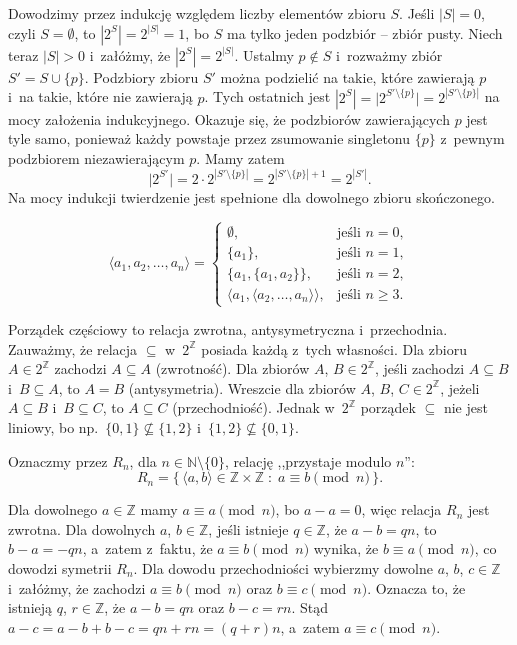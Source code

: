 \exercise %
Dowodzimy przez indukcję względem liczby elementów zbioru $S$. Jeśli $|S|=0$, czyli $S=\emptyset$, to $|2^S|=2^{|S|}=1$, bo $S$ ma tylko jeden podzbiór -- zbiór pusty. Niech teraz $|S|>0$ i~załóżmy, że $|2^S|=2^{|S|}$. Ustalmy $p\notin S$ i~rozważmy zbiór $S'=S\cup\{p\}$. Podzbiory zbioru $S'$ można podzielić na takie, które zawierają $p$ i~na takie, które nie zawierają $p$. Tych ostatnich jest $|2^S|=\bigl|2^{S'\setminus\{p\}}\bigr|=2^{|S'\setminus\{p\}|}$ na mocy założenia indukcyjnego. Okazuje się, że podzbiorów zawierających $p$ jest tyle samo, ponieważ każdy powstaje przez zsumowanie singletonu $\{p\}$ z~pewnym podzbiorem niezawierającym $p$. Mamy zatem
\[
	\bigl|2^{S'}\bigr|=2\cdot2^{|S'\setminus\{p\}|} = 2^{|S'\setminus\{p\}|+1} = 2^{|S'|}.
\]
Na mocy indukcji twierdzenie jest spełnione dla dowolnego zbioru skończonego.

\exercise %
\[
	\langle a_1,a_2,\dots,a_n\rangle =
	\begin{cases}
		\emptyset, & \text{jeśli $n=0$}, \\
		\{a_1\}, & \text{jeśli $n=1$}, \\
		\{a_1,\{a_1,a_2\}\}, & \text{jeśli $n=2$}, \\
		\langle a_1,\langle a_2,\dots,a_n\rangle\rangle, & \text{jeśli $n\ge3$}.
	\end{cases}
\]


\exercise %
Porządek częściowy to relacja zwrotna, antysymetryczna i~przechodnia. Zauważmy, że relacja $\subseteq$ w~$2^\mathbb{Z}$ posiada każdą z~tych własności. Dla zbioru $A\in2^\mathbb{Z}$ zachodzi $A\subseteq A$ (zwrotność). Dla zbiorów $A$, $B\in2^\mathbb{Z}$, jeśli zachodzi $A\subseteq B$ i~$B\subseteq A$, to $A=B$ (antysymetria). Wreszcie dla zbiorów $A$, $B$, $C\in2^\mathbb{Z}$, jeżeli $A\subseteq B$ i~$B\subseteq C$, to $A\subseteq C$ (przechodniość). Jednak w~$2^\mathbb{Z}$ porządek $\subseteq$ nie jest liniowy, bo np.\ $\{0,1\}\nsubseteq\{1,2\}$ i~$\{1,2\}\nsubseteq\{0,1\}$.

\exercise %
Oznaczmy przez $R_n$, dla $n\in\mathbb{N}\setminus\{0\}$, relację ,,przystaje modulo $n$'':
\[
	R_n = \bigl\{\,\langle a,b\rangle\in\mathbb{Z}\times\mathbb{Z}\;:\;a\equiv b\!\!\!\pmod{n}\,\bigr\}.
\]

Dla dowolnego $a\in\mathbb{Z}$ mamy $a\equiv a\pmod{n}$, bo $a-a=0$, więc relacja $R_n$ jest zwrotna. Dla dowolnych $a$, $b\in\mathbb{Z}$, jeśli istnieje $q\in\mathbb{Z}$, że $a-b=qn$, to $b-a=-qn$, a~zatem z~faktu, że $a\equiv b\pmod{n}$ wynika, że $b\equiv a\pmod{n}$, co dowodzi symetrii $R_n$. Dla dowodu przechodniości wybierzmy dowolne $a$, $b$, $c\in\mathbb{Z}$ i~załóżmy, że zachodzi $a\equiv b\pmod{n}$ oraz $b\equiv c\pmod{n}$. Oznacza to, że istnieją $q$, $r\in\mathbb{Z}$, że $a-b=qn$ oraz $b-c=rn$. Stąd $a-c=a-b+b-c=qn+rn=(q+r)n$, a~zatem $a\equiv c\pmod{n}$.

